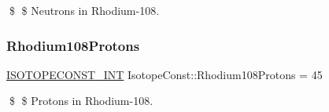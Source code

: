 \$ \$ Neutrons in Rhodium-\/108. \mbox{\label{group___isotope_const-_rhodium-_rh108_ga2df4b40d94f011ac603d881c2924f16b}} 
\subsubsection{\texorpdfstring{Rhodium108\+Protons}{Rhodium108Protons}}
{\footnotesize\ttfamily \mbox{\hyperlink{group___isotope_const-_macros_ga5f18360b3e99483a35c32d789e62621c}{I\+S\+O\+T\+O\+P\+E\+C\+O\+N\+S\+T\+\_\+\+I\+NT}} Isotope\+Const\+::\+Rhodium108\+Protons = 45}

\$ \$ Protons in Rhodium-\/108. 